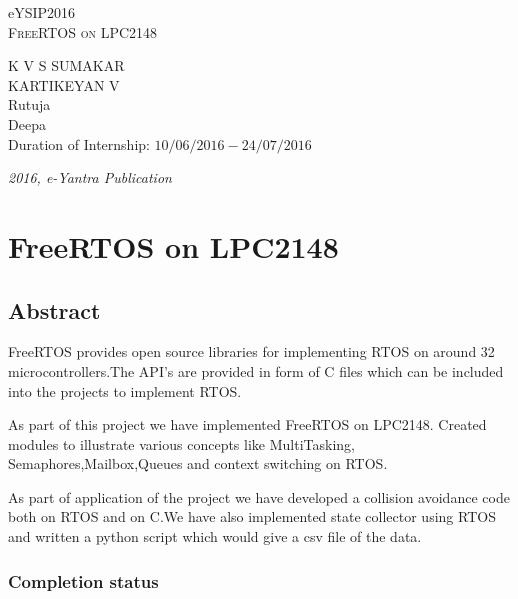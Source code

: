 \documentclass[a4paper,12pt,oneside]{book}
\begin{document}
\begin{titlepage}
\raggedright
{\Large eYSIP2016\\[1cm]}
{\Huge\scshape FreeRTOS on LPC2148 \\[.1in]}
\vfill
\begin{flushright}
{\large K V S SUMAKAR \\}
{\large KARTIKEYAN V \\}
{\large Rutuja \\}
{\large Deepa \\}
{\large Duration of Internship: $ 10/06/2016-24/07/2016 $ \\}
\end{flushright}

{\itshape 2016, e-Yantra Publication}
\end{titlepage}
\tableofcontents
\newpage
\chapter[FreeRTOS on LPC2148]{FreeRTOS on LPC2148}

\section*{Abstract}

FreeRTOS provides open source libraries for implementing RTOS on around 32 microcontrollers.The API's are provided in form of C files which can be included into the projects to implement RTOS.

As part of this project we have implemented FreeRTOS on LPC2148.
Created modules to illustrate various concepts like MultiTasking,  Semaphores,Mailbox,Queues and context switching on RTOS.

As part of application of the project we have developed a collision avoidance code both on RTOS and on C.We have also implemented state collector using RTOS and written a python script which would give a csv file of the data.
\newpage
\subsection*{Completion status}
\end{document}
